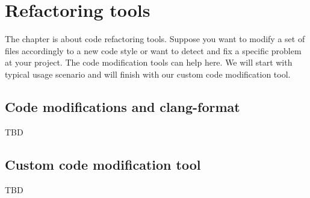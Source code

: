 \chapter{Refactoring tools}
The chapter is about code refactoring tools. Suppose you want to modify a set of
files accordingly to a new code style or want to detect and fix a specific
problem at your project. The code modification tools can help here. We will
start with typical usage scenario and will finish with our custom code
modification tool.

\section{Code modifications and clang-format}
TBD

\section{Custom code modification tool}
TBD
